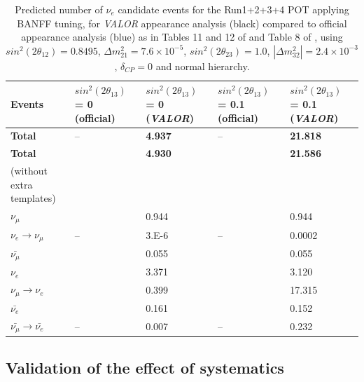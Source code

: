 \begin{table}[htbp]
\center
\begin{tabular} {|p{2cm}|p{2.5cm}|p{2.5cm}||p{2.5cm}|p{2.5cm}|}
\hline
Events  & $sin^{2}(2\theta_{13})$ = 0 (official) & $sin^{2}(2\theta_{13})$ = 0  ({\em VALOR}) & $sin^{2}(2\theta_{13})$ = 0.1 (official) & $sin^{2}(2\theta_{13})$ = 0.1 ({\em VALOR}) \\
\hline \hline
\textbf{Total}  & -- &\textbf{ 4.937} & -- & \textbf{21.818}  \\
\hline
\textbf{Total}  & \textbf{\color{blue}{4.92}} &\textbf{ 4.930} & \textbf{\color{blue}{21.56}} & \textbf{21.586}  \\
(without extra templates) & & & & \\
\hline
$\nu_{\mu}$  & \color{blue}{0.94}  & 0.944 & \color{blue}{0.94}  & 0.944   \\
\hline
$\nu_{e}\rightarrow\nu_{\mu}$  & -- & 3.E-6 & -- & 0.0002   \\
\hline
$\bar{\nu_{\mu}}$  & \color{blue}{0.05} & 0.055 & \color{blue}{0.05}  & 0.055 \\
\hline
$\nu_{e}$  & \color{blue}{3.37} & 3.371 & \color{blue}{3.12} & 3.120 \\
\hline
 $\nu_{\mu} \rightarrow \nu_{e}$ & \color{blue}{0.40} & 0.399 & \color{blue}{17.30} & 17.315 \\
\hline
$\bar{\nu_{e}}$  & \color{blue}{0.16} & 0.161 & \color{blue}{0.15} & 0.152 \\
\hline
$\bar{\nu_{\mu}} \rightarrow\bar{\nu_{e}}$  & -- & 0.007 & -- & 0.232 \\
\hline
\end{tabular}
\caption{Predicted number of $\nu_{e}$ candidate events for the Run1+2+3+4 POT applying BANFF tuning, for {\em VALOR} appearance 
analysis (black) compared to official appearance analysis (blue) as in Tables 11 and 12 of \cite{2013nueptheta} and Table 8 of \cite{2013nuenergy}, 
using $sin^{2}(2\theta_{12}) = 0.8495$, $\Delta m_{21}^{2} = 7.6 \times 10^{-5}$, 
$sin^{2}(2\theta_{23}) =  1.0$, $|\Delta m_{32}^{2}| = 2.4 \times 10^{-3}$, $\delta_{CP} = 0$ and normal hierarchy.}
\label{tab:nuepredictedbanff}
\end{table}


\subsection{Validation of the effect of systematics}

